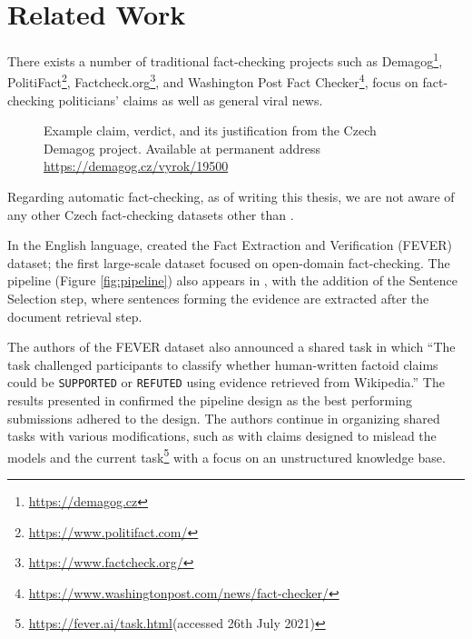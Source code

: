 \section{Related Work}

There exists a number of traditional fact-checking projects such as Demagog\footnote{\url{https://demagog.cz}}, PolitiFact\footnote{\url{https://www.politifact.com/}}, Factcheck.org\footnote{\url{https://www.factcheck.org/}}, and Washington Post Fact Checker\footnote{\url{https://www.washingtonpost.com/news/fact-checker/}}, focus on fact-checking politicians' claims as well as general viral news. 

\begin{figure}[h!]
    \caption{Example claim, verdict, and its justification from the Czech Demagog project. Available at permanent address \url{https://demagog.cz/vyrok/19500}}
\end{figure}

Regarding automatic fact-checking, as of writing this thesis, we are not aware of any other Czech fact-checking datasets other than \citep{czech-fact}.

In the English language, \citet{fever} created the Fact Extraction and Verification (FEVER) dataset; the first large-scale dataset focused on open-domain fact-checking.
The pipeline (Figure \ref{fig:pipeline}) also appears in \citep{fever}, with the addition of the Sentence Selection step, where sentences forming the evidence are extracted after the document retrieval step.

The authors of the FEVER dataset also announced a shared task \citep{fever-2018-shared-task} in which ``The task challenged participants to classify whether human-written factoid claims could be \texttt{SUPPORTED} or \texttt{REFUTED} using evidence retrieved from Wikipedia.'' The results presented in \citep{fever-2018-shared-task} confirmed the pipeline design as the best performing submissions adhered to the design. The authors continue in organizing shared tasks with various modifications, such as \citep{fever-2019-shared-task-adversial} with claims designed to mislead the models and the current task\footnote{\url{https://fever.ai/task.html}(accessed 26th July 2021)} with a focus on an unstructured knowledge base.



